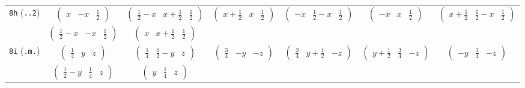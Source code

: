 \documentclass[fleqn,9pt,landscape]{jsarticle}
\begin{document}
\begin{center}
\begin{longtable}{ccccccc}
{\tt 8h} ({\tt ..2}) & $ \begin{pmatrix} x & - x & \frac{1}{2} \end{pmatrix} $ & $ \begin{pmatrix} \frac{1}{2} - x & x + \frac{1}{2} & \frac{1}{2} \end{pmatrix} $ & $ \begin{pmatrix} x + \frac{1}{2} & x & \frac{1}{2} \end{pmatrix} $ & $ \begin{pmatrix} - x & \frac{1}{2} - x & \frac{1}{2} \end{pmatrix} $ & $ \begin{pmatrix} - x & x & \frac{1}{2} \end{pmatrix} $ & $ \begin{pmatrix} x + \frac{1}{2} & \frac{1}{2} - x & \frac{1}{2} \end{pmatrix} $ \\
& $ \begin{pmatrix} \frac{1}{2} - x & - x & \frac{1}{2} \end{pmatrix} $ & $ \begin{pmatrix} x & x + \frac{1}{2} & \frac{1}{2} \end{pmatrix} $ & $  $ & $  $ & $  $ & $  $ \\ \hline
{\tt 8i} ({\tt .m.}) & $ \begin{pmatrix} \frac{1}{4} & y & z \end{pmatrix} $ & $ \begin{pmatrix} \frac{1}{4} & \frac{1}{2} - y & z \end{pmatrix} $ & $ \begin{pmatrix} \frac{3}{4} & - y & - z \end{pmatrix} $ & $ \begin{pmatrix} \frac{3}{4} & y + \frac{1}{2} & - z \end{pmatrix} $ & $ \begin{pmatrix} y + \frac{1}{2} & \frac{3}{4} & - z \end{pmatrix} $ & $ \begin{pmatrix} - y & \frac{3}{4} & - z \end{pmatrix} $ \\
& $ \begin{pmatrix} \frac{1}{2} - y & \frac{1}{4} & z \end{pmatrix} $ & $ \begin{pmatrix} y & \frac{1}{4} & z \end{pmatrix} $ & $  $ & $  $ & $  $ & $  $ \\ \hline

\end{longtable}
\end{center}
\end{document}
